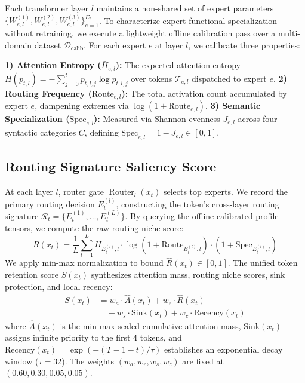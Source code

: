 \documentclass[conference]{IEEEtran}
\begin{document}
Each transformer layer $l$ maintains a non-shared set of expert parameters $\{W_{e,l}^{(1)}, W_{e,l}^{(2)}, W_{e,l}^{(3)}\}_{e=1}^{E_l}$. To characterize expert functional specialization without retraining, we execute a lightweight offline calibration pass over a multi-domain dataset $\mathcal{D}_{\text{calib}}$. For each expert $e$ at layer $l$, we calibrate three properties:

\textbf{1) Attention Entropy ($\bar{H}_{e,l}$):} The expected attention entropy $H(p_{t,l}) = -\sum_{j=0}^{t} p_{t,l,j} \log p_{t,l,j}$ over tokens $\mathcal{T}_{e,l}$ dispatched to expert $e$.
\textbf{2) Routing Frequency ($\text{Route}_{e,l}$):} The total activation count accumulated by expert $e$, dampening extremes via $\log(1 + \text{Route}_{e,l})$.
\textbf{3) Semantic Specialization ($\text{Spec}_{e,l}$):} Measured via Shannon evenness $J_{e,l}$ across four syntactic categories $C$, defining $\text{Spec}_{e,l} = 1 - J_{e,l} \in [0, 1]$.

\subsection{Routing Signature Saliency Score}
At each layer $l$, router gate $\operatorname{Router}_l(x_t)$ selects top experts. We record the primary routing decision $E_t^{(l)}$, constructing the token's cross-layer routing signature $\mathcal{R}_t = \{ E_t^{(1)}, \dots, E_t^{(L)} \}$. By querying the offline-calibrated profile tensors, we compute the raw routing niche score:
\begin{equation}
    R(x_t) = \frac{1}{L}\sum_{l=1}^{L} \bar{H}_{E_t^{(l)}, l} \cdot \log(1 + \text{Route}_{E_t^{(l)}, l}) \cdot (1 + \text{Spec}_{E_t^{(l)}, l})
    \label{eq:routing_score}
\end{equation}
We apply min-max normalization to bound $\hat{R}(x_t) \in [0, 1]$. The unified token retention score $S(x_t)$ synthesizes attention mass, routing niche scores, sink protection, and local recency:
\begin{align}
    S(x_t) &= w_a \cdot \hat{A}(x_t) + w_r \cdot \hat{R}(x_t) \nonumber \\
           &\quad + w_s \cdot \text{Sink}(x_t) + w_c \cdot \text{Recency}(x_t)
    \label{eq:saliency}
\end{align}
where $\hat{A}(x_t)$ is the min-max scaled cumulative attention mass, $\text{Sink}(x_t)$ assigns infinite priority to the first 4 tokens, and $\text{Recency}(x_t) = \exp(-(T - 1 - t)/\tau)$ establishes an exponential decay window ($\tau = 32$). The weights $(w_a, w_r, w_s, w_c)$ are fixed at $(0.60, 0.30, 0.05, 0.05)$.
\end{document}
